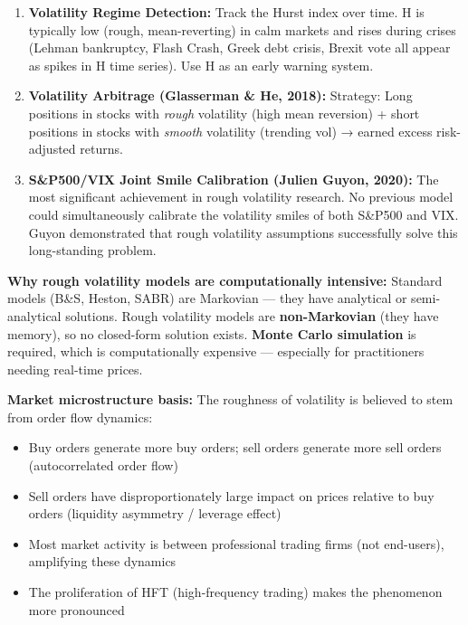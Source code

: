 \documentclass[12pt,openany]{book}
\theoremstyle{definition}
\theoremstyle{remark}
\begin{document}
\begin{enumerate}
\item \textbf{Volatility Regime Detection:} Track the Hurst index over time. H is typically low (rough, mean-reverting) in calm markets and rises during crises (Lehman bankruptcy, Flash Crash, Greek debt crisis, Brexit vote all appear as spikes in H time series). Use H as an early warning system.


\item \textbf{Volatility Arbitrage (Glasserman \& He, 2018):} Strategy: Long positions in stocks with \emph{rough} volatility (high mean reversion) + short positions in stocks with \emph{smooth} volatility (trending vol) → earned excess risk-adjusted returns.


\item \textbf{S\&P500/VIX Joint Smile Calibration (Julien Guyon, 2020):} The most significant achievement in rough volatility research. No previous model could simultaneously calibrate the volatility smiles of both S\&P500 and VIX. Guyon demonstrated that rough volatility assumptions successfully solve this long-standing problem.


\end{enumerate}
\textbf{Why rough volatility models are computationally intensive:} Standard models (B\&S, Heston, SABR) are Markovian --- they have analytical or semi-analytical solutions. Rough volatility models are \textbf{non-Markovian} (they have memory), so no closed-form solution exists. \textbf{Monte Carlo simulation} is required, which is computationally expensive --- especially for practitioners needing real-time prices.

\textbf{Market microstructure basis:} The roughness of volatility is believed to stem from order flow dynamics:

\begin{itemize}
\item Buy orders generate more buy orders; sell orders generate more sell orders (autocorrelated order flow)


\item Sell orders have disproportionately large impact on prices relative to buy orders (liquidity asymmetry / leverage effect)


\item Most market activity is between professional trading firms (not end-users), amplifying these dynamics


\item The proliferation of HFT (high-frequency trading) makes the phenomenon more pronounced


\end{itemize}
\medskip
\end{document}
